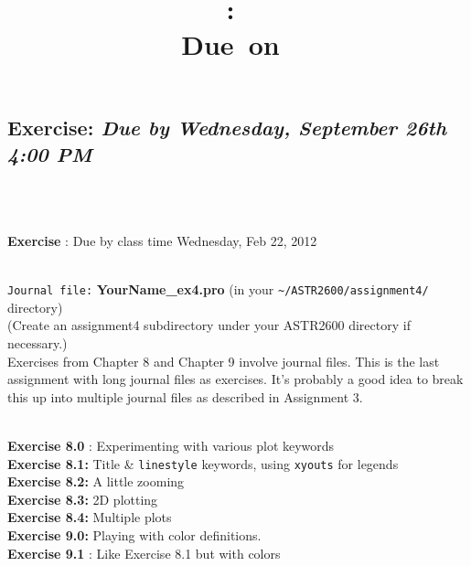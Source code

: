 \documentclass{article}
\title{\vspace{2in}\textmd{\textbf{\hmwkClass:\ \hmwkTitle}}\\\normalsize\vspace{0.1in}\small{Due\ on\ \hmwkDueDate}\\\vspace{0.1in}\large{}\vspace{3in}}
\date{}
\newcommand{\hmwkDueDate}{Wednesday, September 26th 4:00 PM}
\begin{document}
 \begin{spacing}{1.0}
 \newpage
 
 
 
 \section{\textbf{Exercise:} \emph{  Due by \hmwkDueDate}}
 
 \\ 
  \par \\ 
  \textbf{Exercise} :   Due by class time Wednesday, Feb 22, 2012 \\ 
  \par \\ 
  \verb|Journal file:| \textbf{YourName\_ex4.pro} (in your \verb|~/ASTR2600/assignment4/ |directory)\\ 
  (Create an assignment4 subdirectory under your ASTR2600 directory if necessary.) \\ 
  Exercises from Chapter 8 and Chapter 9 involve journal files.   This is the last assignment with long journal files as exercises.   It’s probably a good idea to break this up into multiple journal files as described in Assignment 3. \\ 
  \par \\ 
  \textbf{Exercise 8.0} : Experimenting with various plot keywords \\ 
  \textbf{Exercise 8.1:}  Title \&  \verb|linestyle|  keywords, using  \verb|xyouts|  for legends \\ 
  \textbf{Exercise 8.2:}  A little zooming \\ 
  \textbf{Exercise 8.3:}  2D plotting \\ 
  \textbf{Exercise 8.4:}  Multiple plots \\ 
  \textbf{Exercise 9.0:}  Playing with color definitions. \\ 
  \textbf{Exercise 9.1} : Like Exercise 8.1 but with colors \\ 
  \par \\ 

\end{spacing}
\end{document}
